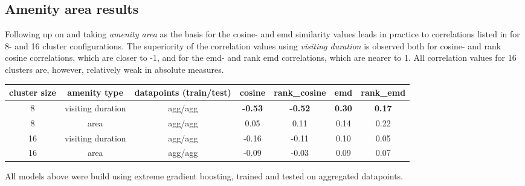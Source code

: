 \subsection{Amenity area results}
\label{evaluation:amenity_area}
Following up on  and taking \textit{amenity area} as the basis for the cosine- and emd similarity values leads in practice to correlations listed in  for 8- and 16 cluster configurations. The superiority of the correlation values using \textit{visiting duration} is observed both for cosine- and rank cosine correlations, which are closer to -1, and for the emd- and rank emd correlations, which are nearer to 1. All correlation values for 16 clusters are, however, relatively weak in absolute measures.

\begin{table}[!ht]
		{\begin{tabular}{ | c | c | c | c | c | c | c | }
			\hline
			{cluster size} 	& {amenity type} 	& datapoints (train/test) 	& cosine 	& rank\_cosine & emd & rank\_emd \\ \hline
			8 				& {visiting duration} 		& agg/agg 		& \textbf{-0.53}	& \textbf{-0.52}		&	\textbf{0.30}	&	\textbf{0.17} \\ \hline
			8 				& area 				& agg/agg 		& 0.05	&	0.11	&	0.14	&	0.22 \\ \hline \hline
			16 				& {visiting duration} 		& agg/agg 		& -0.16	&	-0.11	&	0.10	&	0.05 \\ \hline
			16 				& area 				& agg/agg 		& -0.09	&	-0.03	&	0.09	&	0.07 \\ \hline
		\end{tabular}}
		\begin{tabnote}
			All models above were build using extreme gradient boosting, trained and tested on aggregated datapoints.  
		\end{tabnote}
		\label{tab:correlation_amenity_area}
\end{table}

